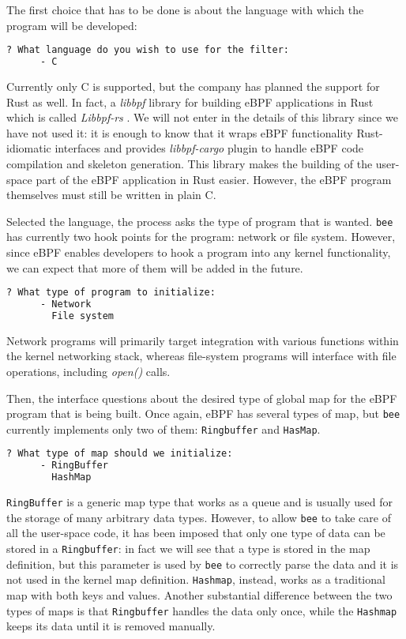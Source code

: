 The first choice that has to be done is about the language with which the program will be developed:

\begin{lstlisting}[language=bash, caption={bee language selection}]
	? What language do you wish to use for the filter: 
	  - C
\end{lstlisting}

Currently only C is supported, but the company has planned the support for Rust as well.
In fact, a \textit{libbpf} library for building eBPF applications in Rust which is called \textit{Libbpf-rs} \cite{libbpfRustGithubRepo}.
We will not enter in the details of this library since we have not used it: it is enough to know that it wraps eBPF functionality Rust-idiomatic interfaces and provides \textit{libbpf-cargo} plugin to handle eBPF code compilation and skeleton generation.
This library makes the building of the user-space part of the eBPF application in Rust easier.
However, the eBPF program themselves must still be written in plain C.

Selected the language, the process asks the type of program that is wanted.
\verb|bee| has currently two hook points for the program: network or file system.
However, since eBPF enables developers to hook a program into any kernel functionality, we can expect that more of them will be added in the future.

\begin{lstlisting}[language=bash, caption={bee type of program selection}]
	? What type of program to initialize: 
	  - Network
	    File system
\end{lstlisting}

Network programs will primarily target integration with various functions within the kernel networking stack, whereas file-system programs will interface with file operations, including \textit{open()} calls.

Then, the interface questions about the desired type of global map for the eBPF program that is being built.
Once again, eBPF has several types of map, but \verb|bee| currently implements only two of them: \verb|Ringbuffer| and \verb|HasMap|.

\begin{lstlisting}[language=bash, caption={bee map type selection}]
	? What type of map should we initialize: 
	  - RingBuffer
	    HashMap
\end{lstlisting}

\verb|RingBuffer| is a generic map type that works as a queue and is usually used for the storage of many arbitrary data types.
However, to allow \verb|bee| to take care of all the user-space code, it has been imposed that only one type of data can be stored in a \verb|Ringbuffer|: in fact we will see that a type is stored in the map definition, but this parameter is used by \verb|bee| to correctly parse the data and it is not used in the kernel map definition. 
\verb|Hashmap|, instead, works as a traditional map with both keys and values.
Another substantial difference between the two types of maps is that \verb|Ringbuffer| handles the data only once, while the \verb|Hashmap| keeps its data until it is removed manually.

